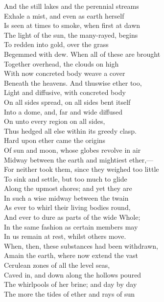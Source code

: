 And the still lakes and the perennial streams\\
Exhale a mist, and even as earth herself\\
Is seen at times to smoke, when first at dawn\\
The light of the sun, the many-rayed, begins\\
To redden into gold, over the grass\\
Begemmed with dew. When all of these are brought\\
Together overhead, the clouds on high\\
With now concreted body weave a cover\\
Beneath the heavens. And thuswise ether too,\\
Light and diffusive, with concreted body\\
On all sides spread, on all sides bent itself\\
Into a dome, and, far and wide diffused\\
On unto every region on all sides,\\
Thus hedged all else within its greedy clasp.\\
Hard upon ether came the origins\\
Of sun and moon, whose globes revolve in air\\
Midway between the earth and mightiest ether,—\\
For neither took them, since they weighed too little\\
To sink and settle, but too much to glide\\
Along the upmost shores; and yet they are\\
In such a wise midway between the twain\\
As ever to whirl their living bodies round,\\
And ever to dure as parts of the wide Whole;\\
In the same fashion as certain members may\\
In us remain at rest, whilst others move.\\
When, then, these substances had been withdrawn,\\
Amain the earth, where now extend the vast\\
Cerulean zones of all the level seas,\\
Caved in, and down along the hollows poured\\
The whirlpools of her brine; and day by day\\
The more the tides of ether and rays of sun\\
